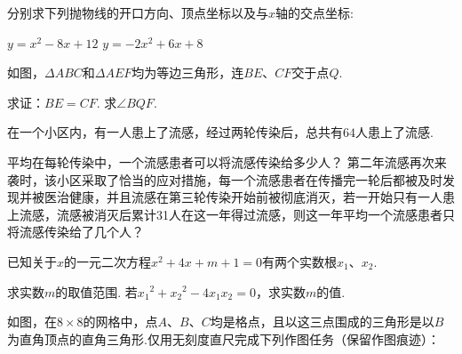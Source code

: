 \documentclass[10pt]{article}
\begin{document}
\begin{questions}{\answeringintroduction}
    \question 分别求下列抛物线的开口方向、顶点坐标以及与$x$轴的交点坐标:
    \begin{subquestions}
        \subquestion $y=x^2-8x+12$
        \subquestion $y=-2x^2+6x+8$
    \end{subquestions}
    \addspace
    \question 如图，$\Delta ABC$和$\Delta AEF$均为等边三角形，连$BE$、$CF$交于点$Q$.
    \begin{subquestions}
        \subquestion 求证：$BE=CF$.
        \subquestion 求$\angle BQF$.
    \end{subquestions}
    \begin{figure}[!htb]
        \raggedleft
    \end{figure}
    \question 在一个小区内，有一人患上了流感，经过两轮传染后，总共有$64$人患上了流感.
    \begin{subquestions}
        \subquestion 平均在每轮传染中，一个流感患者可以将流感传染给多少人？
        \subquestion 第二年流感再次来袭时，该小区采取了恰当的应对措施，每一个流感患者在传播完一轮后都被及时发现并被医治健康，并且流感在第三轮传染开始前被彻底消灭，若一开始只有一人患上流感，流感被消灭后累计31人在这一年得过流感，则这一年平均一个流感患者只将流感传染给了几个人？
    \end{subquestions}
    \newpage
    \question 已知关于$x$的一元二次方程$x^2+4x+m+1=0$有两个实数根$x_1$、$x_2$.
    \begin{subquestions}
        \subquestion 求实数$m$的取值范围.
        \subquestion 若${x_1}^2+{x_2}^2-4{x_1}{x_2}=0$，求实数$m$的值.
    \end{subquestions}
    \addspace
    \question 如图，在$8 \times 8$的网格中，点$A$、$B$、$C$均是格点，且以这三点围成的三角形是以$B$为直角顶点的直角三角形.仅用无刻度直尺完成下列作图任务（保留作图痕迹）：

\end{questions}
\end{document}
